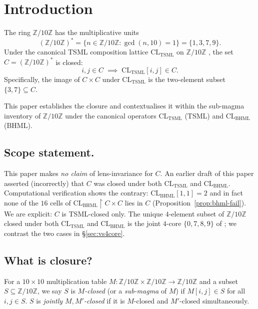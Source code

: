 \documentclass[11pt,reqno]{amsart}
\theoremstyle{plain}
\theoremstyle{definition}
\theoremstyle{remark}
\newcommand{\Z}{\mathbb{Z}}
\newcommand{\TSML}{\mathrm{TSML}}
\newcommand{\BHML}{\mathrm{BHML}}
\begin{document}
\maketitle

\tableofcontents

\section{Introduction}

The ring $\Z/10\Z$ has the multiplicative units
\[
(\Z/10\Z)^* = \{n \in \Z/10\Z : \gcd(n, 10) = 1\}
= \{1, 3, 7, 9\}.
\]
Under the canonical TSML composition lattice $\mathrm{CL}_\TSML$ on
$\Z/10\Z$ \cite{SandersForcing}, the set $C = (\Z/10\Z)^*$ is closed:
\[
i, j \in C \;\implies\; \mathrm{CL}_\TSML[i, j] \in C.
\]
Specifically, the image of $C \times C$ under $\mathrm{CL}_\TSML$ is the
two-element subset $\{3, 7\} \subseteq C$.

This paper establishes the closure and contextualises it within the
sub-magma inventory of $\Z/10\Z$ under the canonical operators
$\mathrm{CL}_\TSML$ (TSML) and $\mathrm{CL}_\BHML$ (BHML).

\subsection{Scope statement.}
This paper makes \emph{no claim} of lens-invariance for $C$.  An earlier
draft of this paper asserted (incorrectly) that $C$ was closed under
both $\mathrm{CL}_\TSML$ and $\mathrm{CL}_\BHML$.  Computational
verification shows the contrary: $\mathrm{CL}_\BHML[1, 1] = 2$ and in
fact none of the $16$ cells of
$\mathrm{CL}_\BHML \restriction C \times C$ lies in $C$
(Proposition~\ref{prop:bhml-fail}).  We are explicit: $C$ is
TSML-closed only.  The unique $4$-element subset of $\Z/10\Z$ closed
under both $\mathrm{CL}_\TSML$ and $\mathrm{CL}_\BHML$ is the joint
$4$-core $\{0, 7, 8, 9\}$ of \cite{SandersGishFourCore}; we contrast
the two cases in \S\ref{sec:vs4core}.

\subsection{What is closure?}
For a $10 \times 10$ multiplication table $M : \Z/10\Z \times \Z/10\Z
\to \Z/10\Z$ and a subset $S \subseteq \Z/10\Z$, we say $S$ is
\emph{$M$-closed} (or a \emph{sub-magma} of $M$) if $M[i, j] \in S$
for all $i, j \in S$.  $S$ is \emph{jointly $M, M'$-closed} if it is
$M$-closed and $M'$-closed simultaneously.
\end{document}
